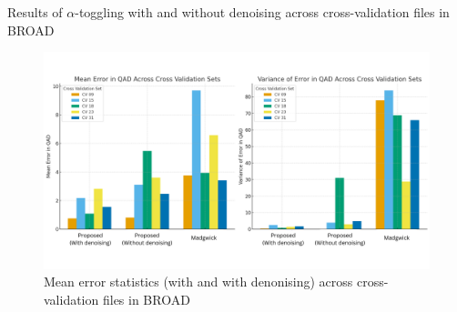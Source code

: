 \documentclass[aspectratio=169,xcolor=dvipsnames]{beamer}
\begin{document}
    

\begin{frame}{Results of $\alpha$-toggling with and without denoising across cross-validation files in BROAD}
\small

\begin{figure}
    \centering
    \includegraphics[width=\linewidth,height=0.65\textheight,keepaspectratio]{logos/barchart_fixed.png}
    \caption{Mean error statistics (with and with denonising) across cross-validation files in BROAD}
    \label{fig:rmnoise_chart}
\end{figure}
\hfill
\end{frame}
\end{document}
